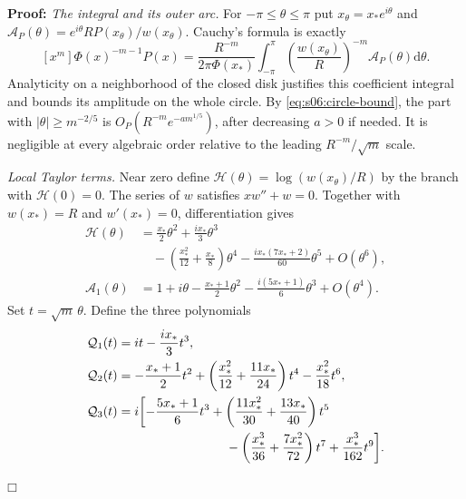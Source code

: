 \documentclass[a4paper,10pt]{article}
\numberwithin{equation}{section}
\newcommand{\dd}{\mathrm{d}}
\theoremstyle{paperplain}
\theoremstyle{paperremark}
\theoremstyle{paperplain}
\newenvironment{prf}{\noindent \textbf{Proof: }}{\hfill $\mdlgwhtsquare$\par\addvspace{0.5\baselineskip}}
\begin{document}
\begin{prf}
\emph{The integral and its outer arc.}
For $-\pi\leq\theta\leq\pi$ put $x_\theta=x_*e^{i\theta}$
and
$\mathcal A_P(\theta)=e^{i\theta}R P(x_\theta)/w(x_\theta)$.
Cauchy's formula is exactly
\begin{equation}\label{eq:s06:cauchy}
 [x^m]\Phi(x)^{-m-1}P(x)
 =\frac{R^{-m}}{2\pi\Phi(x_*)}
 \int_{-\pi}^{\pi}
 \left(\frac{w(x_\theta)}R\right)^{-m}
                         \mathcal A_P(\theta)\dd\theta.
\end{equation}
Analyticity on a neighborhood of the closed disk justifies this
coefficient integral and bounds its amplitude on the whole circle. By
\eqref{eq:s06:circle-bound}, the part with
$|\theta|\geq m^{-2/5}$ is
$O_P(R^{-m}e^{-a m^{1/5}})$, after decreasing $a>0$ if needed.
It is negligible at every algebraic order relative to the leading
$R^{-m}/\sqrt m$ scale.

\emph{Local Taylor terms.}
Near zero define
$\mathcal H(\theta)=\log(w(x_\theta)/R)$ by the branch with
$\mathcal H(0)=0$. The series of $w$ satisfies $xw''+w=0$.
Together with $w(x_*)=R$ and $w'(x_*)=0$, differentiation gives
\begin{align*}
 \mathcal H(\theta)
 &=\frac{x_*}{2}\theta^2+\frac{i x_*}{3}\theta^3\\
 &\quad-\left(\frac{x_*^2}{12}+\frac{x_*}{8}\right)\theta^4
   -\frac{i x_*(7x_*+2)}{60}\theta^5+O(\theta^6),\\
 \mathcal A_1(\theta)
 &=1+i\theta-\frac{x_*+1}{2}\theta^2
                    -\frac{i(5x_*+1)}6\theta^3+O(\theta^4).
\end{align*}
Set $t=\sqrt m\,\theta$.
Define the three polynomials
\begin{align*}
 \mathcal Q_1(t)&=it-\frac{i x_*}{3}t^3,\\
 \mathcal Q_2(t)&=-\frac{x_*+1}{2}t^2
       +\left(\frac{x_*^2}{12}+\frac{11x_*}{24}\right)t^4
       -\frac{x_*^2}{18}t^6,\\
 \mathcal Q_3(t)&=i\biggl[-\frac{5x_*+1}{6}t^3
       +\left(\frac{11x_*^2}{30}+\frac{13x_*}{40}\right)t^5\\
 &\hspace{30mm}
       -\left(\frac{x_*^3}{36}+\frac{7x_*^2}{72}\right)t^7
       +\frac{x_*^3}{162}t^9\biggr].
\end{align*}


\end{prf}
\end{document}
